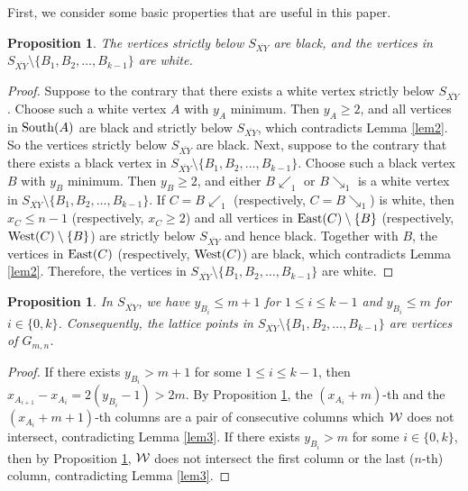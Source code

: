 \documentclass[preprint,12pt]{elsarticle}
\newtheorem{proposition}[theorem]{Proposition}
\def\SEArrow#1#2{#1{\searrow}_{#2}}
\def\SWArrow#1#2{#1{\swarrow}_{#2}}
\def\South{{\rm South}}
\def\East{{\rm East}}
\def\West{{\rm West}}
\begin{document}
{First, we consider some basic properties that are useful in this paper.

\begin{proposition}\label{prop4}
The vertices strictly below $S_{\overline{XY}}$ are black,
and the vertices in $S_{\overline{XY}} \setminus\{B_1,B_2,\ldots,B_{k-1}\}$ are white.
\end{proposition}
\begin{proof}
Suppose to the contrary that there exists a white vertex strictly below $S_{\overline{XY}}$.
Choose such a white vertex $A$ with $y_A$ minimum.
Then $y_A\ge 2$, and all vertices in $\South(A)$ are black
and strictly below $S_{\overline{XY}}$,
which contradicts Lemma \ref{lem2}.
So the vertices strictly below $S_{\overline{XY}}$ are black.
Next, suppose to the contrary that there exists a black vertex in
$S_{\overline{XY}} \setminus \{B_1,B_2,\ldots,B_{k-1}\}$.
Choose such a black vertex $B$ with $y_B$ minimum.
Then $y_B\ge 2$, and either $\SWArrow{B}{1}$ or $\SEArrow{B}{1}$
is a white vertex in $S_{\overline{XY}}\setminus\{B_1,B_2,\ldots,B_{k-1}\}$.
If $C=\SWArrow{B}{1}$ (respectively, $C=\SEArrow{B}{1}$) is white, then
$x_C\le n-1$ (respectively, $x_C\ge 2$) and all vertices in
$\East(C)\setminus\{B\}$ (respectively, $\West(C)\setminus\{B\}$)
are strictly below $S_{\overline{XY}}$ and hence black.
Together with $B$, the vertices in $\East(C)$ (respectively, $\West(C)$) are black,
which contradicts Lemma \ref{lem2}.
Therefore, the vertices in $S_{\overline{XY}}\setminus\{B_1,B_2,\ldots,B_{k-1}\}$ are white.
\end{proof}

\begin{proposition}\label{prop5}
In $S_{\overline{XY}}$,
we have $y_{B_i}\le m+1$ for $1\le i\le k-1$ and $y_{B_i}\le m$ for $i\in\{0,k\}$.
Consequently, the lattice points in
$S_{\overline{XY}} \setminus \{B_1,B_2,\ldots,B_{k-1}\}$ are vertices of $G_{m,n}$.
\end{proposition}
\begin{proof}
If there exists $y_{B_i}>m+1$ for some $1\le i\le k-1$,
then $x_{A_{i+1}}-x_{A_i}= 2(y_{B_i}-1)>2m$.
By Proposition \ref{prop4},
the $(x_{A_i}+m)$-th and
the $(x_{A_i}+m+1)$-th columns are a pair of consecutive columns
which ${\cal W}$ does not intersect,
contradicting Lemma \ref{lem3}.
If there exists $y_{B_i}>m$ for some $i\in\{0,k\}$,
then by Proposition \ref{prop4},
${\cal W}$ does not intersect the first column or the last ($n$-th) column,
contradicting Lemma \ref{lem3}.
\end{proof}

}
\end{document}
